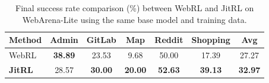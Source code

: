\begin{table}[ht]                                                                                                                         
  \centering                                                                                                                                     
  \caption{Final success rate comparison (\%) between WebRL and JitRL on WebArena-Lite using the same base model and training data.}         
  \label{tab:identical}                                
  \vskip 0.1in                                                                                      
  \begin{tabular}{lcccccc}                                            
  \toprule                                                                                                                                      
  \textbf{Method} & \textbf{Admin} & \textbf{GitLab} & \textbf{Map} & \textbf{Reddit} & \textbf{Shopping} & \textbf{Avg} \\ \midrule             
  WebRL           & \textbf{38.89}          & 23.53           & 9.68         & 50.00           & 17.39             & 27.27        \\                      
  \textbf{JitRL } & 28.57 & \textbf{30.00}  & \textbf{20.00} & \textbf{52.63}  & \textbf{39.13}    & \textbf{32.97} \\ \bottomrule
  \end{tabular}                                                                                                                                  
  \end{table}    